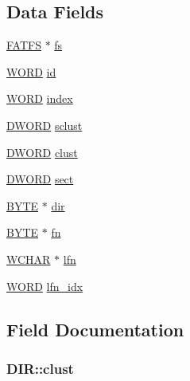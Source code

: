 \subsection*{Data Fields}
\begin{DoxyCompactItemize}
\item 
\hyperlink{structFATFS}{F\+A\+T\+FS} $\ast$ \hyperlink{structDIR_a312eaa66cb703fb2993ea98173dc0c9a}{fs}
\item 
\hyperlink{integer_8h_a197942eefa7db30960ae396d68339b97}{W\+O\+RD} \hyperlink{structDIR_aca2c95a99a04173917ec70c030891383}{id}
\item 
\hyperlink{integer_8h_a197942eefa7db30960ae396d68339b97}{W\+O\+RD} \hyperlink{structDIR_ab95119fbacbe45e3e9ee0f962b844092}{index}
\item 
\hyperlink{integer_8h_ad342ac907eb044443153a22f964bf0af}{D\+W\+O\+RD} \hyperlink{structDIR_a9212af5877b94d790dd3bab3aa320994}{sclust}
\item 
\hyperlink{integer_8h_ad342ac907eb044443153a22f964bf0af}{D\+W\+O\+RD} \hyperlink{structDIR_acfbb8ba2d6e73b6f999ceffd1857c190}{clust}
\item 
\hyperlink{integer_8h_ad342ac907eb044443153a22f964bf0af}{D\+W\+O\+RD} \hyperlink{structDIR_ad01fcc812ed0dad11a593574336adc9e}{sect}
\item 
\hyperlink{integer_8h_a4ae1dab0fb4b072a66584546209e7d58}{B\+Y\+TE} $\ast$ \hyperlink{structDIR_a6c2a8c0cf2d55ae99775e93a16593449}{dir}
\item 
\hyperlink{integer_8h_a4ae1dab0fb4b072a66584546209e7d58}{B\+Y\+TE} $\ast$ \hyperlink{structDIR_a32da2f31d6c3b6c42eef981cb0cfd2ee}{fn}
\item 
\hyperlink{integer_8h_a570001c92f314285ad3e7139d8c58cf7}{W\+C\+H\+AR} $\ast$ \hyperlink{structDIR_af62fd789383e6f1397f74617e11c135d}{lfn}
\item 
\hyperlink{integer_8h_a197942eefa7db30960ae396d68339b97}{W\+O\+RD} \hyperlink{structDIR_acad41b18758c9278c14d47076e8149fc}{lfn\+\_\+idx}
\end{DoxyCompactItemize}


\subsection{Field Documentation}
\subsubsection[{\texorpdfstring{clust}{clust}}]{ D\+I\+R\+::clust}\hypertarget{structDIR_acfbb8ba2d6e73b6f999ceffd1857c190}{}\label{structDIR_acfbb8ba2d6e73b6f999ceffd1857c190}

